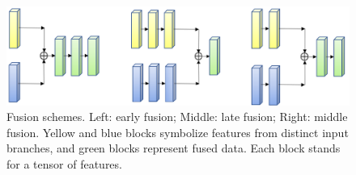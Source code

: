 \begin{figure}[tbh]
\centering
\includegraphics[width=\linewidth]{./images/early_late_middle_fusion.png}
\setlength{\abovecaptionskip}{-10pt plus 3pt minus 2pt}
\setlength{\belowcaptionskip}{-15pt plus 3pt minus 2pt}
\caption{Fusion schemes. Left: early fusion; Middle: late fusion; Right: middle fusion. Yellow and blue blocks symbolize features from distinct input branches, and green blocks represent fused data. Each block stands for a tensor of features. }
\label{fig:fusion}
\end{figure}
